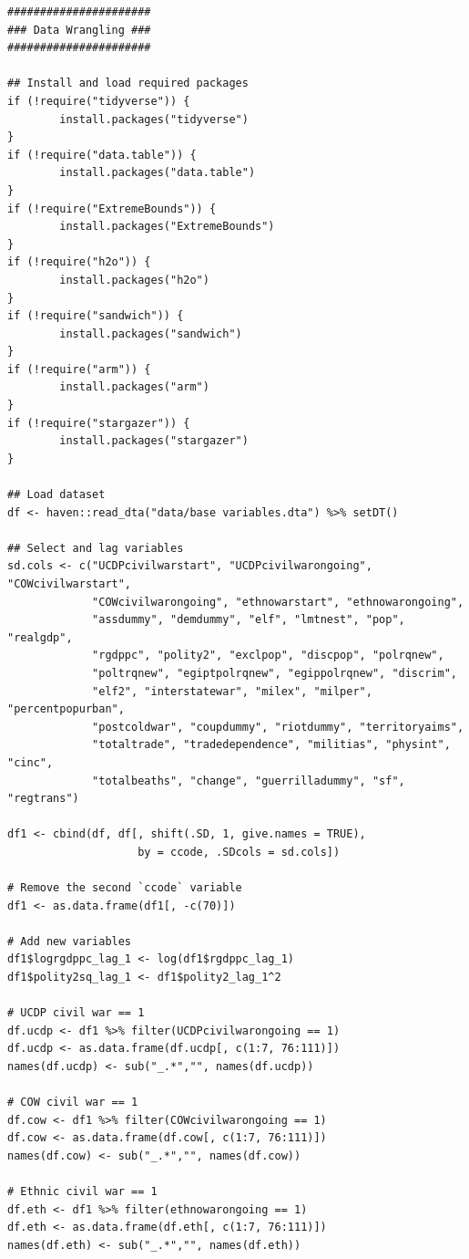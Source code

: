 \documentclass[a4paper,12pt]{article}
\begin{document}
\singlespacing
\footnotesize
\begin{verbatim}
######################
### Data Wrangling ###
######################

## Install and load required packages 
if (!require("tidyverse")) {
        install.packages("tidyverse")
}
if (!require("data.table")) {
        install.packages("data.table")
}
if (!require("ExtremeBounds")) {
        install.packages("ExtremeBounds")
}
if (!require("h2o")) {
        install.packages("h2o")
}
if (!require("sandwich")) {
        install.packages("sandwich")
}
if (!require("arm")) {
        install.packages("arm")
}
if (!require("stargazer")) {
        install.packages("stargazer")
}

## Load dataset
df <- haven::read_dta("data/base variables.dta") %>% setDT()

## Select and lag variables
sd.cols <- c("UCDPcivilwarstart", "UCDPcivilwarongoing", "COWcivilwarstart",
             "COWcivilwarongoing", "ethnowarstart", "ethnowarongoing",
             "assdummy", "demdummy", "elf", "lmtnest", "pop", "realgdp",
             "rgdppc", "polity2", "exclpop", "discpop", "polrqnew",
             "poltrqnew", "egiptpolrqnew", "egippolrqnew", "discrim",
             "elf2", "interstatewar", "milex", "milper", "percentpopurban",
             "postcoldwar", "coupdummy", "riotdummy", "territoryaims",
             "totaltrade", "tradedependence", "militias", "physint", "cinc",
             "totalbeaths", "change", "guerrilladummy", "sf", "regtrans")

df1 <- cbind(df, df[, shift(.SD, 1, give.names = TRUE),
                    by = ccode, .SDcols = sd.cols]) 

# Remove the second `ccode` variable
df1 <- as.data.frame(df1[, -c(70)])

# Add new variables
df1$logrgdppc_lag_1 <- log(df1$rgdppc_lag_1)
df1$polity2sq_lag_1 <- df1$polity2_lag_1^2

# UCDP civil war == 1
df.ucdp <- df1 %>% filter(UCDPcivilwarongoing == 1)
df.ucdp <- as.data.frame(df.ucdp[, c(1:7, 76:111)])
names(df.ucdp) <- sub("_.*","", names(df.ucdp)) 

# COW civil war == 1
df.cow <- df1 %>% filter(COWcivilwarongoing == 1)
df.cow <- as.data.frame(df.cow[, c(1:7, 76:111)])
names(df.cow) <- sub("_.*","", names(df.cow)) 

# Ethnic civil war == 1
df.eth <- df1 %>% filter(ethnowarongoing == 1)
df.eth <- as.data.frame(df.eth[, c(1:7, 76:111)])
names(df.eth) <- sub("_.*","", names(df.eth)) 


\end{verbatim}
\end{document}
